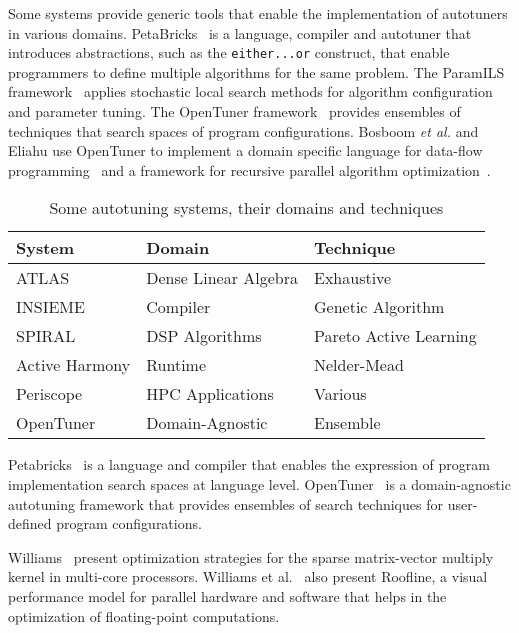 Some systems provide generic tools that enable the implementation of
autotuners in various domains. PetaBricks~\cite{ansel2009petabricks} is a
language, compiler and autotuner that introduces abstractions, such as the
\texttt{\footnotesize either...or} construct, that enable programmers to define
multiple algorithms for the same problem.  The ParamILS
framework~\cite{hutter2009paramils} applies stochastic local search methods
for algorithm configuration and parameter tuning. The OpenTuner
framework~\cite{ansel2014opentuner} provides ensembles of techniques that
search spaces of program configurations. Bosboom \emph{et al.} and Eliahu use
OpenTuner to implement a domain specific language for data-flow
programming~\cite{bosboom2014streamjit} and a framework for recursive parallel
algorithm optimization~\cite{eliahu2015frpa}.

\begin{table}[htpb]
    \centering
    \begin{tabular}{@{}lll@{}}
        \toprule
        System & Domain & Technique \\ \midrule
        ATLAS & Dense Linear Algebra & Exhaustive \\
        INSIEME & Compiler & Genetic Algorithm \\
        SPIRAL & DSP Algorithms & Pareto Active Learning \\
        Active Harmony & Runtime & Nelder-Mead \\
        Periscope & HPC Applications & Various \\
        OpenTuner & Domain-Agnostic & Ensemble \\ \bottomrule
    \end{tabular}
    \caption{Some autotuning systems, their domains and techniques}
\end{table}

Petabricks~\cite{ansel2009petabricks} is a language and compiler that enables
the expression of program implementation search spaces at language level.
OpenTuner~\cite{ansel2014opentuner} is a domain-agnostic autotuning framework
that provides ensembles of search techniques for user-defined program
configurations.

Williams~\cite{williams2009optimization} present optimization strategies for
the sparse matrix-vector multiply kernel in multi-core processors.  Williams et
al.~\cite{williams2009roofline} also present Roofline, a visual performance
model for parallel hardware and software that helps in the optimization of
floating-point computations.

